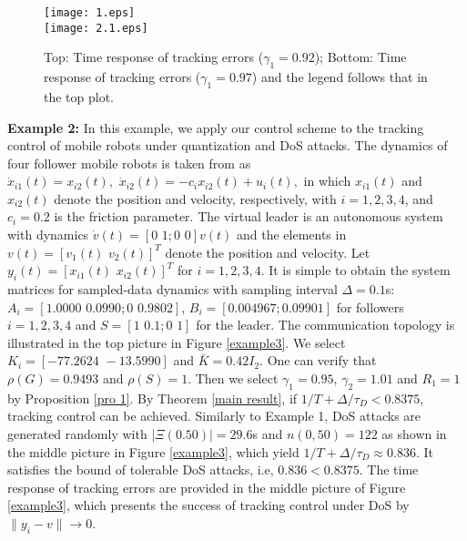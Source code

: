 \documentclass{autart}
\begin{document}
\begin{figure}[t]
	\begin{center}
		\texttt{[image: 1.eps]} \\
		\texttt{[image: 2.1.eps]} \\
		\vspace{-2mm}
		\linespread{1}\caption{Top: Time response of tracking errors ($\gamma_1=0.92$); Bottom: Time response of tracking errors ($\gamma_1=0.97$) and the legend follows that in the top plot.} \label{example1}
	\end{center}
	\vspace{-2mm}
\end{figure}

\textbf{Example 2:} 
In this example, we apply our control scheme to the tracking control of mobile robots under quantization and DoS attacks. The dynamics of four follower mobile robots is taken from \cite{guo2021linear} as 
$
\dot x_{i1}(t)= x_{i2}(t),\,\,\dot x _{i2}(t)= -c_ix_{i2}(t)+u_i(t),
$
in which $x_{i1}(t)$ and $x_{i2}(t)$ denote the position and velocity, respectively, with $i=1, 2, 3, 4$, and $c_i=0.2$ is the friction parameter. The virtual leader is an autonomous system with dynamics $\dot v(t) =[0\,\, 1;0 \,\,0]v(t)$ and the elements in $v(t)=[v_1(t) \,\,v_2(t)]^T$ denote the position and velocity. Let $y_i(t)=[x_{i1}(t)\,\, x_{i2}(t)]^T$ for $i=1, 2, 3, 4$. 
It is simple to obtain the system matrices for sampled-data dynamics with sampling interval $\Delta =0.1$s:
$A_i=[1.0000\,\,0.0990;0\,\,  0.9802]$, $B_i=[0.004967; 0.09901]$ for followers $i=1,2,3,4$ and $S=[1 \,\, 0.1;0\,\, 1]$ for the leader. The communication topology is illustrated in the top picture in Figure \ref{example3}. We select $K_i=[-77.2624\,\,-13.5990]$ and $\bar K=0.42I_2$. One can verify that $\rho(G)=0.9493$ and $\rho(S)=1$. Then we select $\gamma_1=0.95$, $\gamma_2=1.01$ and $R_1=1$ by Proposition \ref{pro 1}. By Theorem \ref{main result}, if $1/T+\Delta/\tau_D < 0.8375$, tracking control can be achieved. Similarly to Example 1, DoS attacks are generated randomly with $|\Xi(0.50)|=29.6$s and $n(0,50)=122$ as shown in the middle picture in Figure \ref{example3}, which yield $1/T+\Delta /\tau_D \approx 0.836$. It satisfies the bound of tolerable DoS attacks, i.e, $0.836 < 0.8375$. The time response of tracking errors are provided in the middle picture of Figure \ref{example3}, which presents the success of tracking control under DoS by $\|y_i-v\|\to 0$.  
\end{document}
